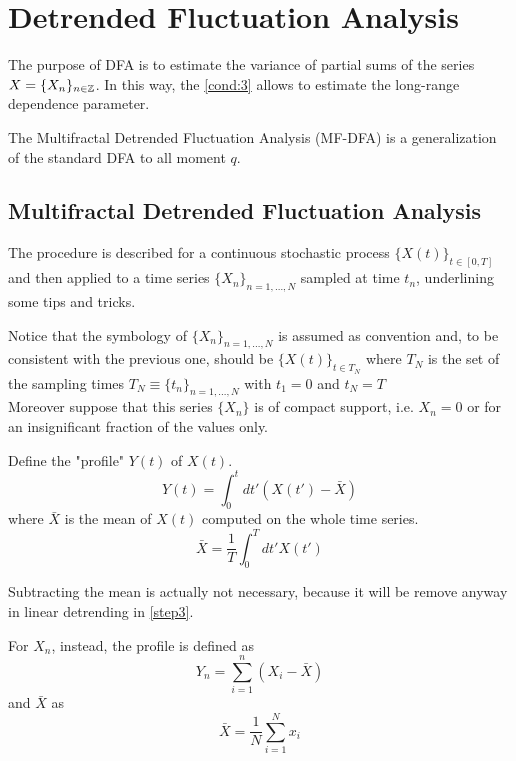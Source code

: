 \section{Detrended Fluctuation Analysis}\label{sec:dfa}

The purpose of DFA is to estimate the variance of partial sums of the series $X = \{ X_n \}_{n \in \mathbb{Z}}$. In this way, the \autoref{cond:3} allows to estimate the long-range dependence parameter. 

The Multifractal Detrended Fluctuation Analysis (MF-DFA) is a generalization of the standard DFA to all moment $q$. 

\subsection{Multifractal Detrended Fluctuation Analysis}
The procedure is described for a continuous stochastic process $\{X(t)\}_{t\in [0, T]}$ and then applied to a time series $\{ X_n \}_{n = 1, \dots, N} $ sampled at time $t_n$, underlining some tips and tricks. 

Notice that the symbology of $\{ X_n \}_{n = 1, \dots, N} $ is assumed as convention and, to be consistent with the previous one, should be
$\{ X(t) \}_{t \in T_N}$ where $T_N$ is the set of the sampling times $T_N \equiv \{ t_n\}_{n = 1, \dots, N}$ with $t_1 = 0$ and $t_N = T$ \\
Moreover suppose that this series $\{ X_n \}$ is of compact support, i.e. $X_n = 0$ or for an insignificant fraction of the values only. 

\begin{step}\label{step1}
Define the "profile" $Y(t)$ of $X(t)$.
\begin{equation}
	Y( t ) = \int_{0}^{t} dt' (X( t' ) - \bar{X} ) 
\end{equation}
where $\bar{X}$ is the mean of $X(t)$ computed on the whole time series.
\begin{equation}
	\bar{X} = \frac{1}{T} \int_{0}^{T} dt' X( t' )
\end{equation}

Subtracting the mean is actually not necessary, because it will be remove anyway in linear detrending in \autoref{step3}.

For $X_n$, instead, the profile is defined as 
\begin{equation}
	Y_n = \sum_{i=1}^{n} \left( X_i - \bar{X} \right)
\end{equation}
and $\bar{X}$ as 
\begin{equation}
	\bar{X} = \frac{1}{N} \sum_{i=1}^{N} x_i 
\end{equation}
\end{step}

